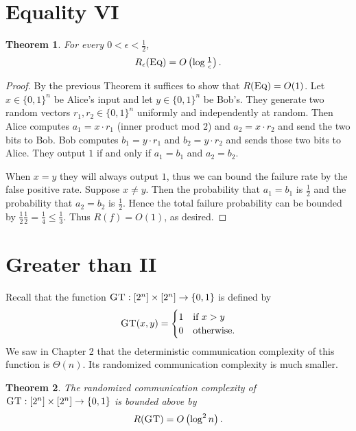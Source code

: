 \documentclass[11pt]{amsart}
\theoremstyle{plain}
\newtheorem{theorem}{Theorem}
\theoremstyle{definition}
\theoremstyle{plain}
\newcommand{\Eq}{\textsc{Eq}}
\newcommand{\GT}{\textsc{GT}}
\begin{document}
\newpage 
\section{Equality VI}


\begin{theorem}
For every $0 < \epsilon < \frac12$,
\[
R_\epsilon(\Eq) = O\left(\log \tfrac1\epsilon \right).
\]
\end{theorem}

\begin{proof}
By the previous Theorem it suffices to show that $R(\Eq) = O(1)$. Let $x \in \{0,1\}^n$ be Alice's input and let $y \in \{0,1\}^n$ be Bob's. They generate two random vectors $r_1, r_2  \in \{0,1\}^n$ uniformly and independently at random. Then Alice computes $a_1 = x\cdot r_1$ (inner product mod $2$) and $a_2 = x\cdot r_2$ and send the two bits to Bob. Bob computes $b_1 = y\cdot r_1$ and $b_2 = y \cdot r_2$ and sends those two bits to Alice. They output $1$ if and only if $a_1 = b_1$ and $a_2 = b_2$.

When $x = y$ they will always output $1$, thus we can bound the failure rate by the false positive rate. Suppose $x \neq y$. Then the probability that $a_1 = b_1$ is $\frac{1}{2}$ and the probability that $a_2 = b_2$ is $\frac{1}{2}$. Hence the total failure probability can be bounded by  $\frac{1}{2}\frac{1}{2} = \frac{1}{4} \leq \frac{1}{3}$. Thus $R(f) = O(1)$, as desired.
\end{proof}


\newpage 
\section{Greater than II}

Recall that the function $\GT : [2^n] \times [2^n] \to \{0,1\}$ is defined by
\[
\GT(x,y) = \begin{cases}
1 & \mbox{if } x > y \\
0 & \mbox{otherwise.}
\end{cases}
\]
We saw in Chapter 2 that the deterministic communication complexity of this function is $\Theta(n)$. Its randomized communication complexity is much smaller.

\begin{theorem}
The randomized communication complexity of $\GT : [2^n] \times [2^n] \to \{0,1\}$ is bounded above by
\[
R(\GT) = O\left(\log^2 n \right).
\]
\end{theorem}
\end{document}
